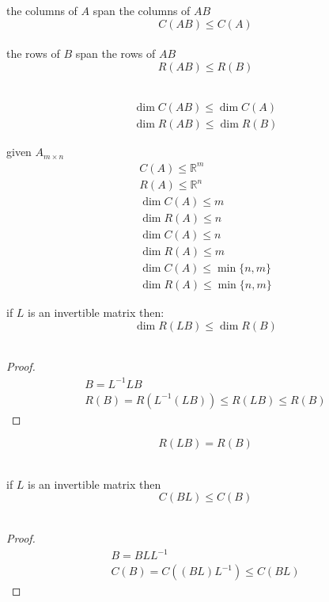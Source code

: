 \documentclass[a4paper,12pt]{article}
\begin{document}
\begin{definition}
\begin{entailment}
the columns of \(A\) span the columns of \(AB\)\\
\[
  C(AB) \leq C(A)
\]\\
the rows of \(B\) span the rows of \(AB\)\\
\[
  R(AB) \leq R(B)
\]\\
\end{entailment}

\begin{entailment}
\begin{align*}
  \dim C(AB) \leq \dim C(A)\\
  \dim R(AB) \leq \dim R(B)
\end{align*}
\end{entailment}

\begin{entailment}
given \(A_{m \times n}\)\\
\begin{gather*}
  C(A) \leq \mathbb{R}^m\\
  R(A) \leq \mathbb{R}^n\\
  \dim C(A) \leq m\\
  \dim R(A) \leq n\\
  \dim C(A) \leq n\\
  \dim R(A) \leq m\\
  \dim C(A) \leq \min\{n,m\}\\
  \dim R(A) \leq \min\{n,m\}
\end{gather*}
\end{entailment}

\begin{lemma}
if \(L\) is an invertible matrix then:\\
\[
  \dim R(LB) \leq \dim R(B)
\]\\
\begin{proof}
\begin{gather*}
  B = L^{-1}LB\\
  R(B) = R(L^{-1}(LB)) \leq R(LB) \leq R(B)
\end{gather*}
\end{proof}

\begin{entailment}
\[
  R(LB) = R(B)
\]\\
\end{entailment}
\end{lemma}

\begin{lemma}
if \(L\) is an invertible matrix then\\
\[
  C(BL) \leq C(B)
\]\\
\begin{proof}
\begin{gather*}
  B = BLL^{-1}\\
  C(B) = C((BL)L^{-1}) \leq C(BL)
\end{gather*}
\end{proof}


\end{lemma}
\end{definition}
\end{document}
